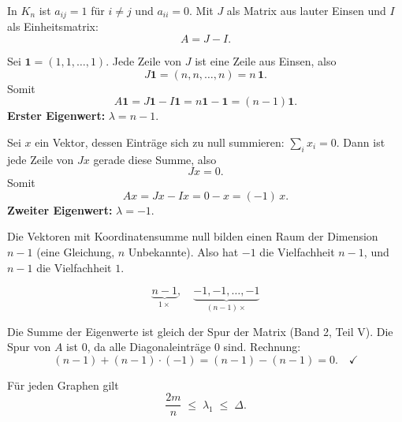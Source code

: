 \begin{merksatz}
In $K_n$ ist $a_{ij} = 1$ für $i \neq j$ und $a_{ii} = 0$. Mit $J$ als Matrix aus lauter Einsen und $I$ als Einheitsmatrix:
\[ A = J - I . \]

Sei $\mathbf{1} = (1,1,\ldots,1)$. Jede Zeile von $J$ ist eine Zeile aus Einsen, also
\[ J\mathbf{1} = (n, n, \ldots, n) = n\,\mathbf{1} . \]
Somit
\[ A\mathbf{1} = J\mathbf{1} - I\mathbf{1} = n\mathbf{1} - \mathbf{1} = (n-1)\mathbf{1} . \]
\textbf{Erster Eigenwert:} $\lambda = n-1$.

Sei $x$ ein Vektor, dessen Einträge sich zu null summieren: $\sum_i x_i = 0$. Dann ist jede Zeile von $Jx$ gerade diese Summe, also
\[ Jx = 0 . \]
Somit
\[ Ax = Jx - Ix = 0 - x = (-1)\,x . \]
\textbf{Zweiter Eigenwert:} $\lambda = -1$.

Die Vektoren mit Koordinatensumme null bilden einen Raum der Dimension $n-1$ (eine Gleichung, $n$ Unbekannte). Also hat $-1$ die Vielfachheit $n-1$, und $n-1$ die Vielfachheit $1$.

\[ \underbrace{n-1}_{1\times}, \quad \underbrace{-1, -1, \ldots, -1}_{(n-1)\times} \]

Die Summe der Eigenwerte ist gleich der Spur der Matrix (Band 2, Teil V). Die Spur von $A$ ist $0$, da alle Diagonaleinträge $0$ sind. Rechnung:
\[ (n-1) + (n-1)\cdot(-1) = (n-1) - (n-1) = 0 . \quad \checkmark \]
\end{merksatz}

\begin{merksatz}
Für jeden Graphen gilt
\[ \frac{2m}{n} \;\le\; \lambda_1 \;\le\; \Delta . \]
\end{merksatz}

